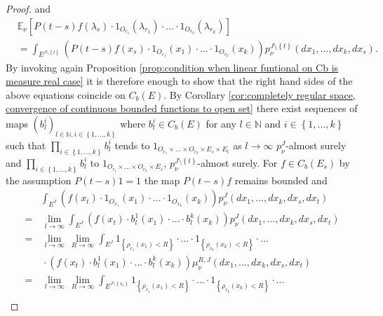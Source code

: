 \documentclass[a4paper,12pt]{article}
\theoremstyle{definition}
\theoremstyle{remark}
\numberwithin{equation}{section}
\numberwithin{theorem}{section}
\begin{document}
\begin{proof}
and 
\begin{align*}
 & \mathbb{E}_{\nu}\left[P\left(t-s\right)f(\lambda_{s})\cdot1_{O_{r_{1}}}\left(\lambda_{r_{1}}\right)\cdot...\cdot1_{O_{r_{k}}}\left(\lambda_{r_{k}}\right)\right]\\
 & =\int_{E^{J\setminus\left\{ t\right\} }}\left(P\left(t-s\right)f(x_s)\cdot1_{O_{r_{1}}}\left(x_{1}\right)\cdot...\cdot1_{O_{r_{k}}}\left(x_{k}\right)\right)p_{\nu}^{J \setminus\left\{ t\right\} }(dx_{1},...,dx_{k},dx_s).
\end{align*}
By invoking again Proposition \ref{prop:condition when linear funtional on Cb is measure real case}
it is therefore enough to show that the right hand sides of the above equations  
coincide on $C_{b}(E)$.
By Corollary \ref{cor:completely regular space, convergence of continuous bounded functions to open set}
there exist sequences of maps $\left(b_{l}^{i}\right)_{l\in\mathbb{N},i\in\left\{ 1,...,k\right\} }$
where $b_{l}^{i}\in C_{b}\left(E\right)$ for any $l\in\mathbb{N}$
and $i\in\left\{ 1,...,k\right\} $ such that 
$
\underset{i\in\left\{ 1,...,k\right\} }{\prod}b_{l}^{i}$ tends to $1_{O_{r_{1}}\times...\times O_{r_{k}}\times E_{s}\times E_{t}}$ as $l \to \infty$
 $p_{\nu}^{J}$-almost surely and 
$
\underset{i\in\left\{ 1,...,k\right\} }{\prod}b_{l}^{i}$ to $1_{O_{r_{i}}\times...\times O_{r_{k}}\times E_{s}}$, $p_{\nu}^{J\setminus\left\{ t\right\} }$-almost surely. For
$f\in C_{b}(E_{s})$ by the assumption $P\left(t-s\right)1=1$ the
map $P\left(t-s\right)f$ remains bounded and 
\begin{align*}
 & \int_{E^{J}}\left(f(x_{t})\cdot1_{O_{x_{1}}}\left(x_{1}\right)\cdot...\cdot1_{O_{x_{k}}}\left(x_{k}\right)\right)p_{\nu}^{J}(dx_{1},...,dx_{k},dx_{s},dx_{t})\\
 =& \,\underset{l\rightarrow\infty}{\lim}\int_{E^{J}}\left(f(x_t)\cdot b_{l}^{1}\left(x_{1}\right)\cdot...\cdot b_{l}^{k}\left(x_{k}\right)\right)p_{\nu}^{J}(dx_{1},...,dx_{k},dx_{s},dx_{t})\\
 =& \,\underset{l\rightarrow\infty}{\lim}\,
 \underset{R\rightarrow\infty}{\lim}\int_{E^{J}}1_{\left\{ \rho_{r_{1}}(x_1)<R\right\} }\cdot...\cdot1_{\left\{ \rho_{r_{k}}(x_k)<R\right\} }\cdot...\\
 & \,\cdot\left(f(x_t)\cdot b_{l}^{1}\left(x_{1}\right)\cdot...\cdot b_{l}^{k}\left(x_{k}\right)\right)\mu_{\nu}^{R,J}(dx_{1},...,dx_{k},dx_{s},dx_{t})\\
 =&\, \underset{l\rightarrow\infty}{\lim}\,\underset{R\rightarrow\infty}{\lim}\int_{E^{J\setminus\left\{ x_t\right\} }}1_{\left\{ \rho_{r_{1}}(x_1)<R\right\} }\cdot...\cdot1_{\left\{ \rho_{r_{k}}(x_k)<R\right\} }\cdot...\\

\end{align*}
\end{proof}
\end{document}
